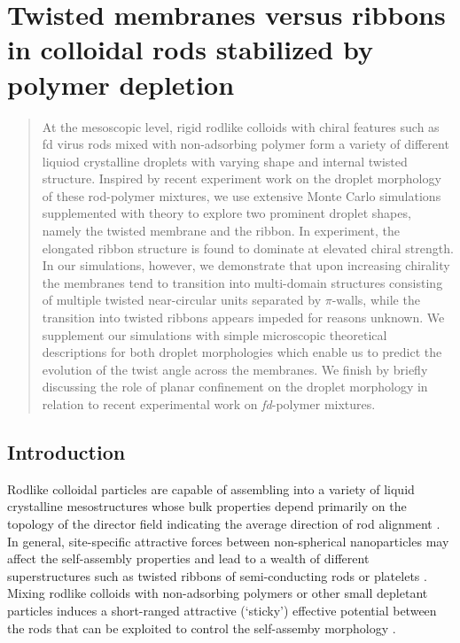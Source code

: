 
\chapter{ Twisted membranes versus ribbons in colloidal rods stabilized by polymer depletion}



\begin{abstract}

At the mesoscopic level, rigid rodlike colloids with chiral features such as {\rm fd} virus rods mixed with non-adsorbing polymer form a variety of different liquiod crystalline droplets with varying shape and internal twisted structure. Inspired by recent experiment work on the droplet morphology of these rod-polymer mixtures, we use extensive Monte Carlo simulations supplemented with theory to explore two prominent droplet shapes, namely the twisted membrane and the ribbon. In experiment, the elongated ribbon structure is found to dominate at elevated chiral strength. In our simulations, however, we demonstrate that upon increasing chirality the membranes tend to transition into multi-domain structures consisting of multiple twisted near-circular units separated by $\pi$-walls, while the transition into twisted ribbons appears impeded for reasons unknown. We supplement our simulations with simple microscopic theoretical descriptions for both droplet morphologies which enable us to predict the evolution of the twist angle across the membranes.  We finish by  briefly discussing the role of planar confinement on the droplet morphology in relation to recent experimental work on {\em fd}-polymer mixtures.

\end{abstract}



\section{Introduction}




Rodlike colloidal particles are capable of assembling into a variety of liquid crystalline mesostructures whose bulk properties depend primarily on the topology of the director field indicating the average direction of rod alignment \cite{dogic-fraden_fil,Ikkala2407}.
In general,  site-specific attractive forces between non-spherical nanoparticles may affect the self-assembly properties  and lead to a wealth of different superstructures \cite{Wang358} such as twisted ribbons of semi-conducting rods \cite{Srivastava1355} or platelets \cite{Janae1701483}.
Mixing rodlike colloids with non-adsorbing polymers or other small depletant particles induces a short-ranged attractive  (`sticky') effective potential between the rods that can be exploited to control the self-assemby morphology \cite{Baranov2010,Sharma2014}. 
 



